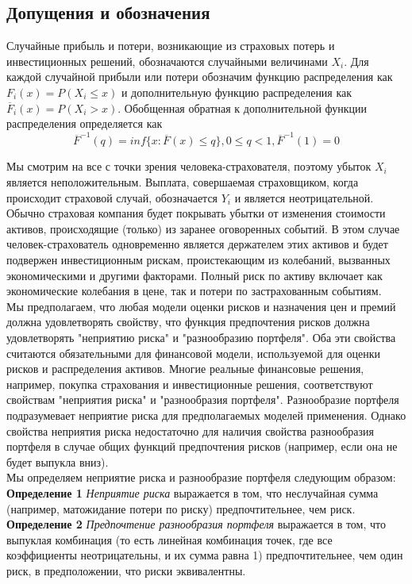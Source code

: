 \documentclass[12pt,a4paper]{article}
\begin{document}
\subsection{  Допущения и обозначения}
Случайные прибыль и потери, возникающие из страховых потерь и инвестиционных решений, обозначаются случайными величинами $X_i.$ Для каждой случайной прибыли или потери обозначим функцию распределения как $F_i(x)=P(X_i \leq x) $ и дополнительную функцию распределения как ${\overline F_i}(x)=P(X_i > x).$ Обобщенная обратная к дополнительной функции распределения определяется как 
$${\overline F^{-1}}(q) = inf\{x: {\overline F}(x) \leq q\}, 0 \leq q < 1, {\overline F^{-1}}(1)=0$$

Мы смотрим на все с точки зрения человека-страхователя, поэтому убыток $X_i$ является неположительным.  Выплата, совершаемая страховщиком, когда происходит страховой случай, обозначается $Y_i$ и является неотрицательной. Обычно страховая компания будет покрывать  убытки от изменения стоимости активов, происходящие  (только) из заранее оговоренных событий. В этом случае человек-страхователь одновременно является  держателем  этих активов и будет подвержен инвестиционным рискам, проистекающим из колебаний, вызванных экономическими и другими факторами. Полный риск по активу включает как экономические колебания в цене, так и потери по застрахованным событиям.\\
Мы предполагаем, что любая модели оценки рисков и назначения цен и премий должна удовлетворять свойству, что функция предпочтения рисков должна удовлетворять "неприятию риска" и "разнообразию портфеля".  Оба эти свойства считаются обязательными для финансовой модели, используемой для оценки рисков и распределения активов. Многие реальные финансовые решения, например, покупка страхования и инвестиционные решения, соответствуют  свойствам  "неприятия риска" и "разнообразия портфеля". Разнообразие портфеля подразумевает неприятие риска для предполагаемых моделей применения. Однако свойства неприятия риска недостаточно для наличия свойства разнообразия портфеля в случае общих функций предпочтения рисков (например, если она не будет выпукла вниз). \\
Мы определяем неприятие риска и разнообразие портфеля следующим образом:\\

{\bf Определение 1} { \itshape Неприятие риска }выражается в том, что неслучайная сумма (например, матожидание потери по риску) предпочтительнее, чем риск.\\
{\bf Определение 2} { \itshape Предпочтение разнообразия портфеля } выражается в том, что выпуклая комбинация (то есть линейная комбинация точек, где все коэффициенты неотрицательны, и их сумма равна 1) предпочтительнее, чем один риск, в предположении, что риски эквивалентны.\\
\end{document}
